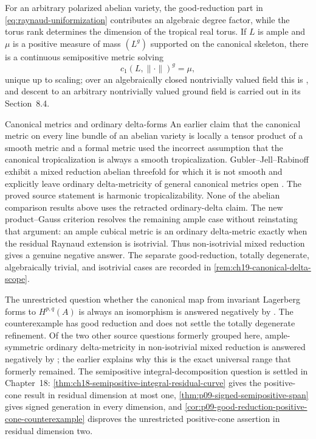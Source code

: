 For an arbitrary polarized abelian variety, the good-reduction part in
\eqref{eq:raynaud-uniformization} contributes an algebraic degree factor,
while the torus rank determines the dimension of the tropical real torus.
If $L$ is ample and $\mu$ is a positive measure of mass $(L^g)$
supported on the canonical skeleton, there is a continuous semipositive
metric solving
\[
                              c_1(L,\|\cdot\|)^g=\mu,
\]
unique up to scaling; over an algebraically closed nontrivially valued field
this is \cite[Theorem~8.3.3]{BGJKK25}, and descent to an arbitrary
nontrivially valued ground field is carried out in its Section~8.4.

\begin{warning}{Canonical metrics and ordinary delta-forms}
An earlier claim that the canonical metric on every line bundle of an
abelian variety is locally a tensor product of a smooth metric and a formal
metric used the incorrect assumption that the canonical tropicalization is
always a smooth tropicalization.  Gubler--Jell--Rabinoff exhibit a mixed
reduction abelian threefold for which it is not smooth and explicitly leave
ordinary delta-metricity of general canonical metrics open
\cite[Remark~16.4 and \S17]{GJR26}.  The proved source statement is harmonic
tropicalizability.  None of the abelian comparison results above uses the
retracted ordinary-delta claim.  The new product--Gauss criterion
 resolves the remaining ample case
without reinstating that argument: an ample cubical metric is an ordinary
delta-metric exactly when the residual Raynaud extension is isotrivial.
Thus non-isotrivial mixed reduction gives a genuine negative answer.  The
separate good-reduction, totally degenerate, algebraically trivial, and
isotrivial cases are recorded in
\cref{rem:ch19-canonical-delta-scope}.
\end{warning}

The unrestricted question whether the canonical map from invariant Lagerberg
forms to $H^{p,q}(A)$ is always an isomorphism is answered negatively by
.  The counterexample has good
reduction and does not settle the totally degenerate refinement.  Of the two
other source questions formerly grouped here, ample-symmetric ordinary
delta-metricity in non-isotrivial mixed reduction is answered negatively by
; the earlier
 explains why this is the exact universal range
that formerly remained.  The semipositive integral-decomposition question is
settled in Chapter~18:
\cref{thm:ch18-semipositive-integral-residual-curve} gives the
positive-cone result in residual dimension at most one,
\cref{thm:p09-signed-semipositive-span} gives signed generation in every
dimension, and
\cref{cor:p09-good-reduction-positive-cone-counterexample} disproves the
unrestricted positive-cone assertion in residual dimension two.

